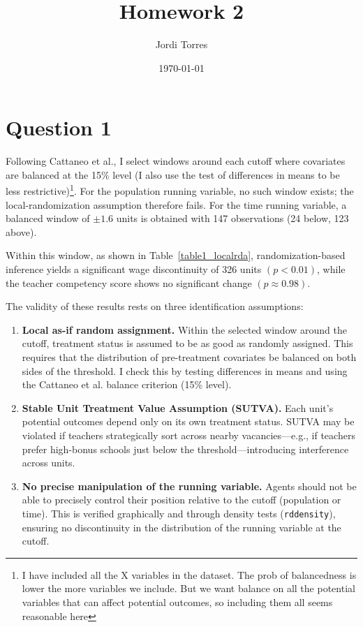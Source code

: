 \documentclass{article}
\begin{document}
\title{Homework 2}
\author{Jordi Torres}
\date{\today}


\maketitle



\section{Question 1}

Following Cattaneo et al., I select windows around each cutoff where covariates are balanced at the 15\% level (I also use the test of differences in means to be less restrictive)\footnote{I have included all the X variables in the dataset. The prob of balancedness is lower the more variables we include. But we want balance on all the potential variables that can affect potential outcomes, so including them all seems reasonable here}. For the population running variable, no such window exists; the local-randomization assumption therefore fails. For the time running variable, a balanced window of $\pm 1.6$ units is obtained with 147 observations (24 below, 123 above).

Within this window, as shown in Table~\ref{table1_localrda}, randomization-based inference yields a significant wage discontinuity of 326 units $(p < 0.01)$, while the teacher competency score shows no significant change $(p \approx 0.98)$.

\vspace{0.5em}
\noindent
The validity of these results rests on three identification assumptions:

\begin{enumerate}
    \item \textbf{Local as-if random assignment.} Within the selected window around the cutoff, treatment status is assumed to be as good as randomly assigned. This requires that the distribution of pre-treatment covariates be balanced on both sides of the threshold. I check this by testing differences in means and using the Cattaneo et al. balance criterion (15\% level).

    \item \textbf{Stable Unit Treatment Value Assumption (SUTVA).} Each unit’s potential outcomes depend only on its own treatment status. SUTVA may be violated if teachers strategically sort across nearby vacancies—e.g., if teachers prefer high-bonus schools just below the threshold—introducing interference across units.

    \item \textbf{No precise manipulation of the running variable.} Agents should not be able to precisely control their position relative to the cutoff (population or time). This is verified graphically and through density tests (\texttt{rddensity}), ensuring no discontinuity in the distribution of the running variable at the cutoff.
\end{enumerate}
\end{document}

